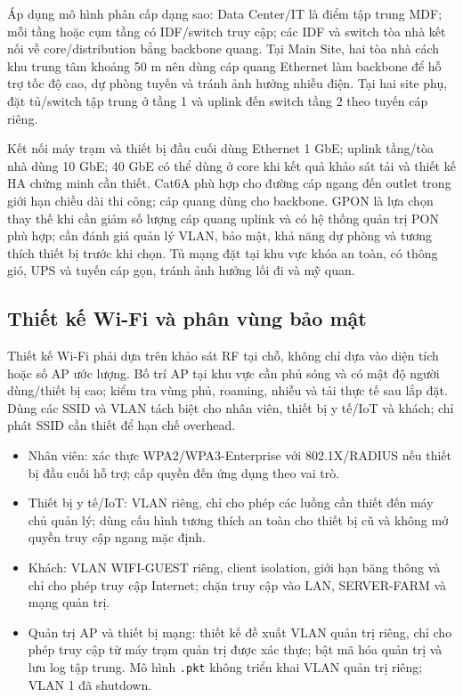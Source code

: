 Áp dụng mô hình phân cấp dạng sao: Data Center/IT là điểm tập trung MDF; mỗi tầng hoặc cụm tầng có IDF/switch truy cập; các IDF và switch tòa nhà kết nối về core/distribution bằng backbone quang. Tại Main Site, hai tòa nhà cách khu trung tâm khoảng 50 m nên dùng cáp quang Ethernet làm backbone để hỗ trợ tốc độ cao, dự phòng tuyến và tránh ảnh hưởng nhiễu điện. Tại hai site phụ, đặt tủ/switch tập trung ở tầng 1 và uplink đến switch tầng 2 theo tuyến cáp riêng.

Kết nối máy trạm và thiết bị đầu cuối dùng Ethernet 1 GbE; uplink tầng/tòa nhà dùng 10 GbE; 40 GbE có thể dùng ở core khi kết quả khảo sát tải và thiết kế HA chứng minh cần thiết. Cat6A phù hợp cho đường cáp ngang đến outlet trong giới hạn chiều dài thi công; cáp quang dùng cho backbone. GPON là lựa chọn thay thế khi cần giảm số lượng cáp quang uplink và có hệ thống quản trị PON phù hợp; cần đánh giá quản lý VLAN, bảo mật, khả năng dự phòng và tương thích thiết bị trước khi chọn. Tủ mạng đặt tại khu vực khóa an toàn, có thông gió, UPS và tuyến cáp gọn, tránh ảnh hưởng lối đi và mỹ quan.

\subsection{Thiết kế Wi-Fi và phân vùng bảo mật}

Thiết kế Wi-Fi phải dựa trên khảo sát RF tại chỗ, không chỉ dựa vào diện tích hoặc số AP ước lượng. Bố trí AP tại khu vực cần phủ sóng và có mật độ người dùng/thiết bị cao; kiểm tra vùng phủ, roaming, nhiễu và tải thực tế sau lắp đặt. Dùng các SSID và VLAN tách biệt cho nhân viên, thiết bị y tế/IoT và khách; chỉ phát SSID cần thiết để hạn chế overhead.

\begin{itemize}
    \item Nhân viên: xác thực WPA2/WPA3-Enterprise với 802.1X/RADIUS nếu thiết bị đầu cuối hỗ trợ; cấp quyền đến ứng dụng theo vai trò.
    \item Thiết bị y tế/IoT: VLAN riêng, chỉ cho phép các luồng cần thiết đến máy chủ quản lý; dùng cấu hình tương thích an toàn cho thiết bị cũ và không mở quyền truy cập ngang mặc định.
    \item Khách: VLAN WIFI-GUEST riêng, client isolation, giới hạn băng thông và chỉ cho phép truy cập Internet; chặn truy cập vào LAN, SERVER-FARM và mạng quản trị.
    \item Quản trị AP và thiết bị mạng: thiết kế đề xuất VLAN quản trị riêng, chỉ cho phép truy cập từ máy trạm quản trị được xác thực; bật mã hóa quản trị và lưu log tập trung. Mô hình \texttt{.pkt} không triển khai VLAN quản trị riêng; VLAN 1 đã shutdown.
\end{itemize}


